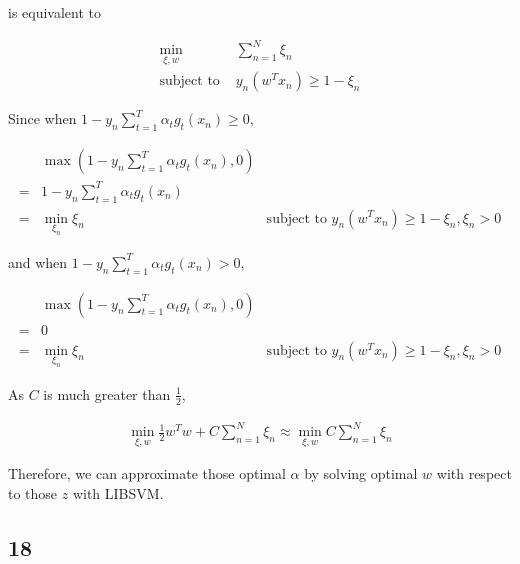 \documentclass[fleqn,a4paper,12pt]{article}
\begin{document}
is equivalent to

\begin{align*}
  \min_{\xi, w} & \sum_{n=1}^N  \xi_n   \\
  \text{subject to } & y_n (w^T x_n) \geq 1 - \xi_n
\end{align*}

Since when $1 - y_n \sum_{t=1}^T \alpha_t g_t(x_n) \geq 0$,

\begin{align*}
  &  \max(1 - y_n \sum_{t=1}^T \alpha_t g_t(x_n), 0) \\
  =& 1 - y_n \sum_{t=1}^T \alpha_t g_t(x_n) \\
  =& \min_{\xi_n} \xi_n  & \text{subject to } y_n (w^T x_n) \geq 1 - \xi_n, \xi_n > 0
\end{align*}

and when $1 - y_n \sum_{t=1}^T \alpha_t g_t(x_n) > 0$,

\begin{align*}
  &  \max(1 - y_n \sum_{t=1}^T \alpha_t g_t(x_n), 0) \\
  =& 0 \\
  =& \min_{\xi_n} \xi_n  & \text{subject to } y_n (w^T x_n) \geq 1 - \xi_n, \xi_n > 0
\end{align*}

As $C$ is much greater than $\frac{1}{2}$,

\begin{align*}
  \min_{\xi, w} \frac{1}{2} w^T w +  C \sum_{n=1}^N  \xi_n \approx \min_{\xi, w} C \sum_{n=1}^N  \xi_n  
\end{align*}

Therefore, we can approximate those optimal $\alpha$ by solving optimal $w$ with respect to those $z$ with LIBSVM.

\subsection*{18}
\end{document}
